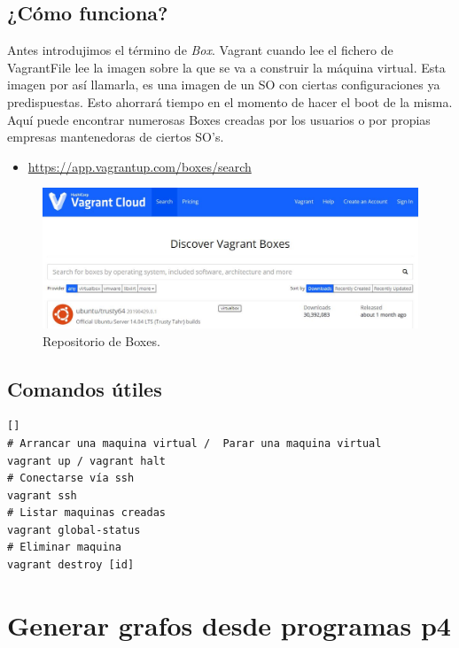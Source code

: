 \section{¿Cómo funciona?}
Antes introdujimos el término de \textit{Box}. Vagrant cuando lee el fichero de VagrantFile lee la imagen sobre la que se va a construir la máquina virtual. Esta imagen por así llamarla, es una imagen de un SO con ciertas configuraciones ya predispuestas. Esto ahorrará tiempo en el momento de hacer el boot de la misma. Aquí puede encontrar numerosas Boxes creadas por los usuarios o por propias empresas mantenedoras de ciertos SO's.
\begin{itemize}
    \item \url{https://app.vagrantup.com/boxes/search}
\end{itemize}
\begin{figure}[!htb]
  \centering
    \includegraphics[width=0.7\linewidth]{./img/anexos/2.JPG}
    \caption{Repositorio de Boxes.}
  \label{fig:yo}
\end{figure}

\section{Comandos útiles}
\begin{verbatim}[]
# Arrancar una maquina virtual /  Parar una maquina virtual
vagrant up / vagrant halt
# Conectarse vía ssh
vagrant ssh
# Listar maquinas creadas
vagrant global-status
# Eliminar maquina 
vagrant destroy [id]
\end{verbatim}
\newpage
\chapter{Generar grafos desde programas p4}
\label{chap:como generar grafos desde programas p4}
